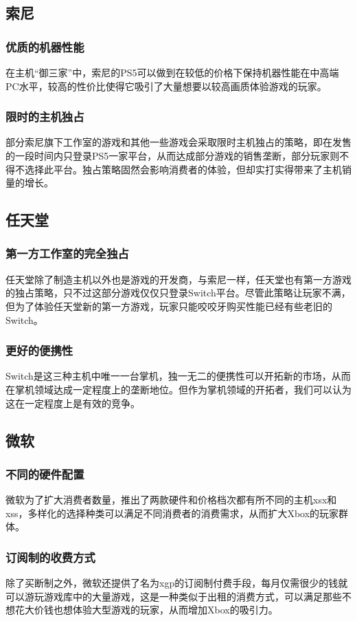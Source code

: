 \documentclass{ctexart}
\begin{document}
\subsection{索尼}
\subsubsection{优质的机器性能}
在主机“御三家”中，索尼的PS5可以做到在较低的价格下保持机器性能在中高端PC水平，较高的性价比使得它吸引了大量想要以较高画质体验游戏的玩家。
\subsubsection{限时的主机独占}
部分索尼旗下工作室的游戏和其他一些游戏会采取限时主机独占的策略，即在发售的一段时间内只登录PS5一家平台，从而达成部分游戏的销售垄断，部分玩家则不得不选择此平台。独占策略固然会影响消费者的体验，但却实打实得带来了主机销量的增长。
\subsection{任天堂}
\subsubsection{第一方工作室的完全独占}
任天堂除了制造主机以外也是游戏的开发商，与索尼一样，任天堂也有第一方游戏的独占策略，只不过这部分游戏仅仅只登录Switch平台。尽管此策略让玩家不满，但为了体验任天堂新的第一方游戏，玩家只能咬咬牙购买性能已经有些老旧的Switch。
\subsubsection{更好的便携性}
Switch是这三种主机中唯一一台掌机，独一无二的便携性可以开拓新的市场，从而在掌机领域达成一定程度上的垄断地位。但作为掌机领域的开拓者，我们可以认为这在一定程度上是有效的竞争。
\subsection{微软}
\subsubsection{不同的硬件配置}
微软为了扩大消费者数量，推出了两款硬件和价格档次都有所不同的主机xsx和xss，多样化的选择种类可以满足不同消费者的消费需求，从而扩大Xbox的玩家群体。
\subsubsection{订阅制的收费方式}
除了买断制之外，微软还提供了名为xgp的订阅制付费手段，每月仅需很少的钱就可以游玩游戏库中的大量游戏，这是一种类似于出租的消费方式，可以满足那些不想花大价钱也想体验大型游戏的玩家，从而增加Xbox的吸引力。
\end{document}

